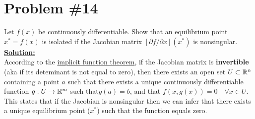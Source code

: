 
\section*{Problem \#14}

Let $f(x)$ be continuously differentiable. Show that an equilibrium point $x^* = f(x)$ is isolated if the Jacobian matrix $[ \partial f /\partial x ](x^*)$ is nonsingular. \\

\noindent \underline{\textbf{Solution:}} \\

\noindent According to the \underline{implicit function theorem}, if the Jacobian matrix is \textbf{invertible} (aka if its deteminant is not equal to zero), then there exists an open set $ U \subset \mathbb{R}^n$ containing a point $a$ such that there exists a unique continuously differentiable function $g:U\rightarrow \mathbb{R}^m$ such that$g(a) = b$, and that $f(x,g(x)) = 0 \quad \forall x \in U$. \\

\noindent This states that if the Jacobian is nonsingular then we can infer that there exists a unique equilibrium point ($x^*$) such that the function equals zero.
